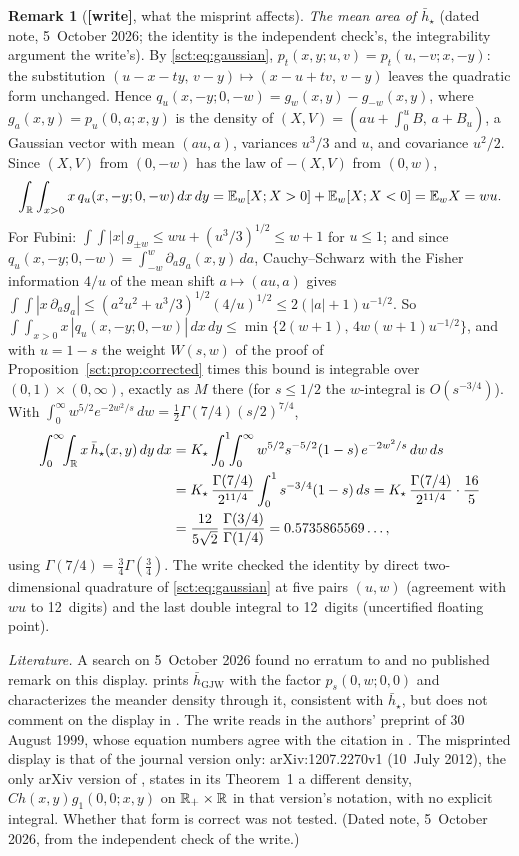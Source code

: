 \documentclass[11pt,letterpaper]{article}
\theoremstyle{definition}\newtheorem{remark}[theorem]{Remark}
\newcommand{\hstar}{\bar h_\star}\newcommand{\fstar}{f_\star}\newcommand{\Kstar}{K_\star}
\newcommand{\wtag}{\textup{\textbf{[write]}}}
\begin{document}
\begin{remark}[\wtag, what the misprint affects]
\emph{The mean area of $\hstar$} (dated note, 5~October 2026; the identity is the independent check's, the integrability argument the write's). By \eqref{sct:eq:gaussian}, $p_t(x,y;u,v)=p_t(u,-v;x,-y)$: the substitution $(u-x-ty,\,v-y)\mapsto(x-u+tv,\,v-y)$ leaves the quadratic form unchanged. Hence $q_u(x,-y;0,-w)=g_w(x,y)-g_{-w}(x,y)$, where $g_a(x,y)=p_u(0,a;x,y)$ is the density of $(X,V)=(au+\int_0^uB,\,a+B_u)$, a Gaussian vector with mean $(au,a)$, variances $u^3/3$ and $u$, and covariance $u^2/2$. Since $(X,V)$ from $(0,-w)$ has the law of $-(X,V)$ from $(0,w)$,
\[
 \int_\mathbb R\int_{x>0}x\,q_u(x,-y;0,-w)\,dx\,dy=\mathbb E_w[X;X>0]+\mathbb E_w[X;X<0]=\mathbb E_wX=wu.
\]
For Fubini: $\int\!\!\int|x|\,g_{\pm w}\le wu+(u^3/3)^{1/2}\le w+1$ for $u\le1$; and since $q_u(x,-y;0,-w)=\int_{-w}^{w}\partial_ag_a(x,y)\,da$, Cauchy--Schwarz with the Fisher information $4/u$ of the mean shift $a\mapsto(au,a)$ gives $\int\!\!\int|x\,\partial_ag_a|\le(a^2u^2+u^3/3)^{1/2}(4/u)^{1/2}\le2(|a|+1)u^{-1/2}$. So $\int\!\!\int_{x>0}x\,|q_u(x,-y;0,-w)|\,dx\,dy\le\min\{2(w+1),\,4w(w+1)u^{-1/2}\}$, and with $u=1-s$ the weight $W(s,w)$ of the proof of Proposition~\ref{sct:prop:corrected} times this bound is integrable over $(0,1)\times(0,\infty)$, exactly as $M$ there (for $s\le1/2$ the $w$-integral is $O(s^{-3/4})$). With $\int_0^\infty w^{5/2}e^{-2w^2/s}\,dw=\frac12\Gamma(7/4)(s/2)^{7/4}$,
\begin{align*}
 \int_0^\infty\!\!\int_\R x\,\hstar(x,y)\,dy\,dx&=\Kstar\int_0^1\!\!\int_0^\infty w^{5/2}s^{-5/2}(1-s)\,e^{-2w^2/s}\,dw\,ds\\
&=\Kstar\,\frac{\Gamma(7/4)}{2^{11/4}}\int_0^1s^{-3/4}(1-s)\,ds=\Kstar\,\frac{\Gamma(7/4)}{2^{11/4}}\cdot\frac{16}{5}\\
&=\frac{12}{5\sqrt2}\,\frac{\Gamma(3/4)}{\Gamma(1/4)}=0.5735865569\ldots,
\end{align*}
using $\Gamma(7/4)=\frac34\Gamma(\frac34)$. The write checked the identity by direct two-dimensional quadrature of \eqref{sct:eq:gaussian} at five pairs $(u,w)$ (agreement with $wu$ to 12~digits) and the last double integral to 12~digits (uncertified floating point).

\emph{Literature.} A search on 5~October 2026 found no erratum to \cite{dw} and no published remark on this display. \cite{bdw} prints $\bar h_{\mathrm{GJW}}$ with the factor $p_s(0,w;0,0)$ and characterizes the meander density through it, consistent with $\hstar$, but does not comment on the display in \cite[Theorem~1]{dw}. The write reads \cite{gjw} in the authors' preprint of 30 August 1999, whose equation numbers agree with the citation in \cite{dw}. The misprinted display is that of the journal version only: arXiv:1207.2270v1 (10~July 2012), the only arXiv version of \cite{dw}, states in its Theorem~1 a different density, $Ch(x,y)g_1(0,0;x,y)$ on $\mathbb R_+\times\mathbb R$ in that version's notation, with no explicit integral. Whether that form is correct was not tested. (Dated note, 5~October 2026, from the independent check of the write.)
\end{remark}
\end{document}
